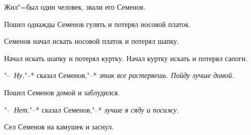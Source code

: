 Жил"=был один человек, звали его Семенов.

Пошел однажды Семенов гулять и потерял носовой платок.

Семенов начал искать носовой платок и потерял шапку.

Начал искать шапку и потерял куртку. Начал куртку искать и потерял сапоги.

"--~\emph{Ну,}"--* сказал Семенов,"--* \emph{этак все растеряешь. Пойду лучше домой.}

Пошел Семенов домой и заблудился.

"--~\emph{Нет,}"--* сказал Семенов,"--* \emph{лучше я сяду и посижу.}

Сел Семенов на камушек и заснул.
